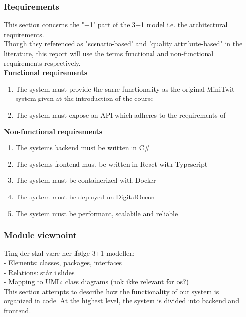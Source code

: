 \subsubsection{Requirements}    
This section concerns the "+1" part of the 3+1 model i.e. the architectural requirements. \\
Though they referenced as "scenario-based" and "quality attribute-based" in the literature, this 
report will use the terms functional and non-functional requirements respectively. \\

\noindent
\textbf{Functional requirements}
\begin{enumerate}
    \item The system must provide the same functionality as the original MiniTwit system given at the introduction of the course
    \item The system must expose an API which adheres to the requirements of \cite{apispec} 
\end{enumerate} 

\noindent
\textbf{Non-functional requirements}
\begin{enumerate}
    \item The systems backend must be written in C\# 
    \item The systems frontend must be written in React with Typescript
    \item The system must be containerized with Docker
    \item The system must be deployed on DigitalOcean
    \item The system must be performant, scalabile and reliable
\end{enumerate}
    
\subsubsection{Module viewpoint}
Ting der skal være her ifølge 3+1 modellen: \\
- Elements: classes, packages, interfaces \\
- Relations: står i slides \\
- Mapping to UML: class diagrams (nok ikke relevant for os?) \\


This section attempts to describe how the functionality of our system is organized in code. 
At the highest level, the system is divided into backend and frontend.\\


